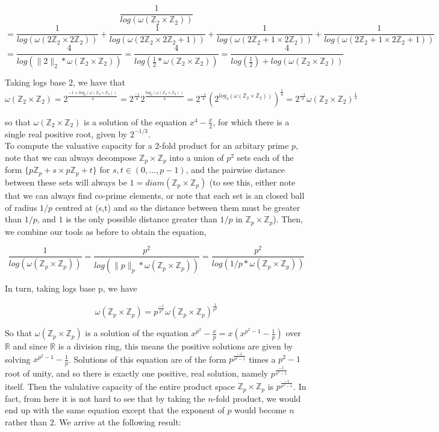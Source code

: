 \[
\frac{1}{log(\omega(\mathbb{Z}_2 \times \mathbb{Z}_2))} \]
\[ = \frac{1}{log(\omega(2\mathbb{Z}_2 \times 2\mathbb{Z}_2))} + \frac{1}{log(\omega(2\mathbb{Z}_2 \times 2\mathbb{Z}_2 +1))} + \frac{1}{log(\omega(2\mathbb{Z}_2+1 \times 2\mathbb{Z}_2))} + \frac{1}{log(\omega(2\mathbb{Z}_2+1 \times 2\mathbb{Z}_2+1))}\]
\[ = \frac{4}{log(\|2\|_2 * \omega(\mathbb{Z}_2 \times \mathbb{Z}_2))} = \frac{4}{log(\frac{1}{2} * \omega(\mathbb{Z}_2 \times \mathbb{Z}_2))} =  \frac{4}{log(\frac{1}{2}) + log(\omega(\mathbb{Z}_2 \times \mathbb{Z}_2))}\]

 Taking logs base $2$, we have that 
\[\omega(\mathbb{Z}_2 \times \mathbb{Z}_2) = 2^{\frac{-1 + log_2(\omega(\mathbb{Z}_2 \times \mathbb{Z}_2))}{4}} =  2^{\frac{-1}{4}} 2^ {\frac{log_2(\omega(\mathbb{Z}_2 \times \mathbb{Z}_2))}{4}}
= 2^{\frac{-1}{4}}{(2^ {log_2(\omega(\mathbb{Z}_2 \times \mathbb{Z}_2))})}^{\frac{1}{4}} = 2^{\frac{-1}{4}}{\omega(\mathbb{Z}_2 \times \mathbb{Z}_2)}^{\frac{1}{4}} \]

so that ${\omega(\mathbb{Z}_2 \times \mathbb{Z}_2)}$ is a solution of the equation $x^4 - \frac{x}{2}$, for which there is a single real positive root, given by $2^{-1/3}$.\\


To compute the valuative capacity for a $2$-fold product for an arbitary prime $p$, note that we can always decompose $\mathbb{Z}_p \times \mathbb{Z}_p$ into a union of $p^2$ sets each of the form $\{p\mathbb{Z}_p+s \times p\mathbb{Z}_p +t\}$ for $s,t \in (0,\ldots, p-1)$, and the pairwise distance between these sets will always be $1 = diam(\mathbb{Z}_p \times \mathbb{Z}_p)$ (to see this, either note that we can always find co-prime elements, or note that each set is an closed ball of radius $1/p$ centred at (s,t) and so the distance between them must be greater than $1/p$, and $1$ is the only possible distance greater than $1/p$ in $\mathbb{Z}_p \times \mathbb{Z}_p$).  Then, we combine our tools as before to obtain the equation,

\[\frac{1}{log(\omega(\mathbb{Z}_p \times \mathbb{Z}_p))} = \frac{p^2}{log(\|p\|_p * \omega(\mathbb{Z}_p \times \mathbb{Z}_p))} =  \frac{p^2}{log(1/p * \omega(\mathbb{Z}_p \times \mathbb{Z}_p))}    \]

In turn, taking logs base p, we have 


\[ \omega(\mathbb{Z}_p \times \mathbb{Z}_p) = p^{\frac{-1}{p^2}} \omega(\mathbb{Z}_p \times \mathbb{Z}_p)^{\frac{1}{p^2}}  \]

So that $\omega(\mathbb{Z}_p \times \mathbb{Z}_p)$ is a solution of the equation $x^{p^2} - \frac{x}{p} = x(x^{p^2-1} - \frac{1}{p})$ over $\mathbb{R}$ and since $\mathbb{R}$ is a division ring, this means the positive solutions are given by solving $x^{p^2-1}-\frac{1}{p}$. Solutions of this equation are of the form $p^{\frac{-1}{p^2-1}}$ times a $p^2-1$ root of unity, and so there is exactly one positive, real solution, namely $p^{\frac{-1}{p^2-1}}$ itself. Then the valulative capacity of the entire product space $\mathbb{Z}_p \times \mathbb{Z}_p$ is $p^{\frac{-1}{p^2-1}}$. In fact, from here it is not hard to see that by taking the $n$-fold product, we would end up with the same equation except that the exponent of $p$ would become $n$ rather than $2$. We arrive at the following result:

